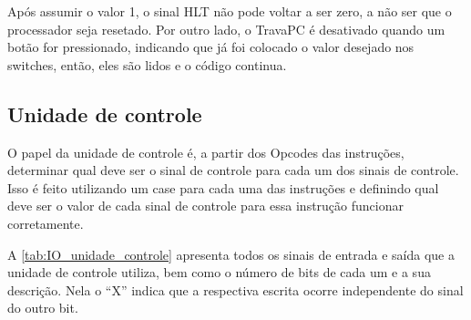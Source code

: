 \documentclass[
	12pt,				%
	oneside,
	a4paper,			%
	english,			%
	french,				%
	spanish,			%
	brazil,				%
	]{abntex2}
\begin{document}
Após assumir o valor 1, o sinal HLT não pode voltar a ser zero, a não ser que o processador seja resetado. Por outro lado, o TravaPC é desativado quando um botão for pressionado, indicando que já foi colocado o valor desejado nos switches, então, eles são lidos e o código continua.

\subsection{Unidade de controle}

O papel da unidade de controle é, a partir dos Opcodes das instruções, determinar qual deve ser o sinal de controle para cada um dos sinais de controle. Isso é feito utilizando um case para cada uma das instruções e definindo qual deve ser o valor de cada sinal de controle para essa instrução funcionar corretamente.

A \autoref{tab:IO_unidade_controle} apresenta todos os sinais de entrada e saída que a unidade de controle utiliza, bem como o número de bits de cada um e a sua descrição. Nela o ``X'' indica que a respectiva escrita ocorre independente do sinal do outro bit.
\end{document}
